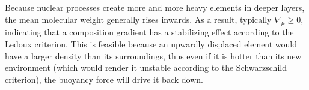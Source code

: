 \documentclass[aps,prb,twocolumn,superscriptaddress,floatfix,longbibliography]{revtex4-2}
\begin{document}
Because nuclear processes create more and more heavy elements in deeper layers, the mean molecular weight generally rises inwards. As a result, typically $\nabla_{\mu} \geq 0$, indicating that a composition gradient has a stabilizing effect according to the Ledoux criterion. This is feasible because an upwardly displaced element would have a larger density than its surroundings, thus even if it is hotter than its new environment (which would render it unstable according to the Schwarzschild criterion), the buoyancy force will drive it back down.




%
%
\end{document}

